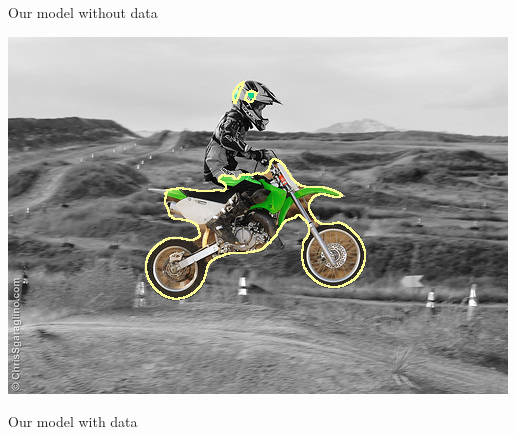 \begin{frame}
\begin{minipage}[t][0.55\textheight][t]{0.5\textwidth}
Our model without data
\end{minipage}%
\begin{minipage}[t][0.55\textheight][t]{0.5\textwidth}
\center
\includegraphics[scale=0.25]{figures/applications-imaging/contour-correction/moto/corrected-seg-with-data.png}

Our model with data
\end{minipage}%

\end{frame}

